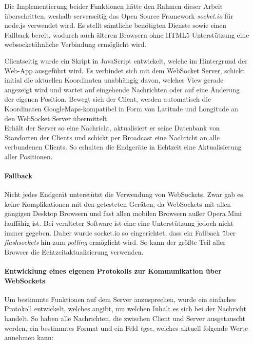 Die Implementierung beider Funktionen hätte den Rahmen dieser Arbeit überschritten, weshalb serverseitig das Open Source Framework \emph{socket.io} für node.js verwendet wird. Es stellt sämtliche benötigten Dienste sowie einen Fallback bereit, wodurch auch älteren Browsern ohne HTML5 Unterstützung eine websocketähnliche Verbindung ermöglicht wird.\par

Clientseitig wurde ein Skript in JavaScript entwickelt, welche im Hintergrund der Web-App ausgeführt wird. Es verbindet sich mit dem WebSocket Server, schickt initial die aktuellen Koordinaten unabhängig davon, welcher View gerade angezeigt wird und wartet auf eingehende Nachrichten oder auf eine Änderung der eigenen Position. Bewegt sich der Client, werden automatisch die Koordinaten GoogleMaps-kompatibel in Form von Latitude und Longitude an den WebSocket Server übermittelt.\\
Erhält der Server so eine Nachricht, aktualisiert er seine Datenbank von Standorten der Clients und schickt per Broadcast eine Nachricht an alle verbundenen Clients. So erhalten die Endgeräte in Echtzeit eine Aktualisierung aller Positionen.

\paragraph{Fallback}
Nicht jedes Endgerät unterstützt die Verwendung von WebSockets. Zwar gab es keine Komplikationen mit den getesteten Geräten, da WebSockets mit allen gängigen Desktop Browsern und fast allen mobilen Browsern außer Opera Mini lauffähig ist. Bei veralteter Software ist eine eine Unterstützung jedoch nicht immer gegeben. Daher wurde socket.io so eingerichtet, dass ein Fallback über \emph{flashsockets} hin zum \emph{polling} ermöglicht wird. So kann der größte Teil aller Browser die Echtzeitaktualisierung verwenden.

\paragraph{Entwicklung eines eigenen Protokolls zur Kommunikation über WebSockets}
Um bestimmte Funktionen auf dem Server anzusprechen, wurde ein einfaches Protokoll entwickelt, welches angibt, um welchen Inhalt es sich bei der Nachricht handelt. So haben alle Nachrichten, die zwischen Client und Server ausgetauscht werden, ein bestimmtes Format und ein Feld \emph{type}, welches aktuell folgende Werte annehmen kann:

